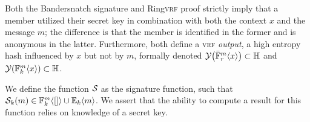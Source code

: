 Both the Bandersnatch signature and Ring\textsc{vrf} proof strictly imply that a member utilized their secret key in combination with both the context $x$ and the message $m$; the difference is that the member is identified in the former and is anonymous in the latter. Furthermore, both define a \textsc{vrf} \emph{output}, a high entropy hash influenced by $x$ but not by $m$, formally denoted $\banderout{\bandersnatch{r}{x}{m}} \subset \hash$ and $\banderout{\bandersig{k}{x}{m}} \subset \hash$.

We define the function $\mathcal{S}_{}$ as the signature function, such that $\signdata{k}{m} \in \bandersig{k}{\sq{}}{m} \cup \sig{k}{m}$. We assert that the ability to compute a result for this function relies on knowledge of a secret key.
